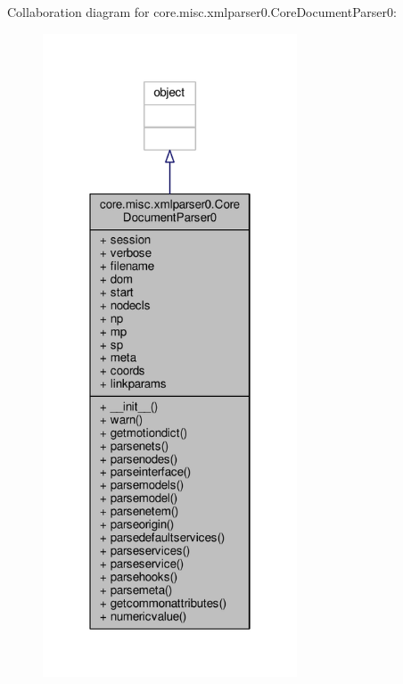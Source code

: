 Collaboration diagram for core.\+misc.\+xmlparser0.\+Core\+Document\+Parser0\+:
\nopagebreak
\begin{figure}[H]
\begin{center}
\leavevmode
\includegraphics[width=214pt]{classcore_1_1misc_1_1xmlparser0_1_1_core_document_parser0__coll__graph}
\end{center}
\end{figure}
